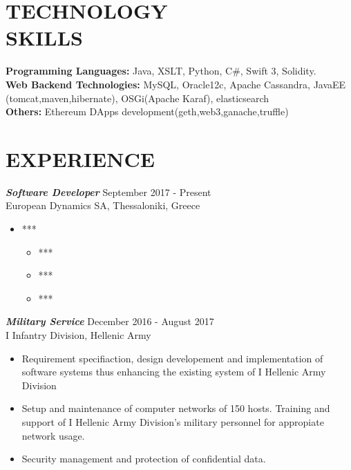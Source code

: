\documentclass[margin, 10pt]{res} %
\begin{document}
\begin{resume}



\section{TECHNOLOGY \\ SKILLS} 

\textbf{Programming Languages:} Java, XSLT, Python, C\#, Swift 3, Solidity. \\
\textbf{Web Backend Technologies:} MySQL, Oracle12c, Apache Cassandra, JavaEE (tomcat,maven,hibernate), OSGi(Apache Karaf), elasticsearch \\
\textbf{Others:} Ethereum DApps development(geth,web3,ganache,truffle)
 
 
\section{EXPERIENCE}

{\sl \textbf{Software Developer}} \hfill September 2017 - Present \\
European Dynamics SA, Thessaloniki, Greece \hfill {} \\
\begin{itemize}
\item ***
\begin{itemize}
\item ***
\item ***
\item ***


\end{itemize}
\end{itemize} 

{\sl \textbf{Military Service} } \hfill December 2016 - August 2017 \\
I Infantry Division, Hellenic Army \\
\begin{itemize} \itemsep -2pt %
\item Requirement specifiaction, design developement and implementation of software systems thus enhancing the existing system of I Hellenic Army Division
\item Setup and maintenance of computer networks of 150 hosts. Training and support of I Hellenic Army Division's military personnel for appropiate network usage.
\item Security management and protection of confidential data.
\end{itemize}
 

\end{resume}
\end{document}
